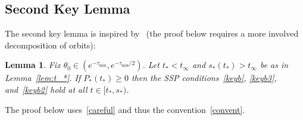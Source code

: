 \documentclass[10pt]{amsart}
\newtheorem{lemm}[theo]{Lemma}\newtheorem{prop}[theo]{Proposition}\newtheorem{coro}[theo]{Corollary}\newtheorem{conj}[theo]{Conjecture}
\theoremstyle{definition}\newtheorem{defi}[theo]{Definition}\newtheorem{rema}[theo]{Remark}\newtheorem{exam}[theo]{Example}\newtheorem{exem}[theo]{Example}\newtheorem{nota}[theo]{Notation}
\begin{document}
\subsection{Second Key Lemma}\label{2ndl}
The second key lemma is inspired by~\cite[Lemma~3.11]{BD2} (the proof below requires a more involved decomposition of orbits):


\begin{lemm}\label{lem:short small t>}
Fix $\theta_0\in (e^{-\tau_{\min}}, e^{-\tau_{\min}/2})$. Let $t_*<t_\infty$ and $s_*(t_*)>t_\infty$ be as in Lemma~\ref{lem:t_*}. If $P_*(t_*)\ge 0$ then the SSP conditions~\eqref{keyb}, \eqref{keyb3}, and~\eqref{keyb2} hold at all $t\in [t_*, s_*)$.
\end{lemm}

The proof below uses~\eqref{careful} and thus the convention~\eqref{convent}.
\end{document}
